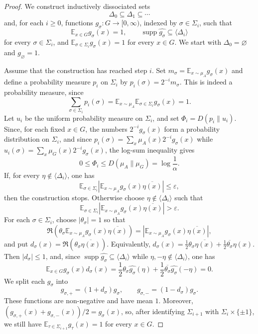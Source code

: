\documentclass[10pt,a4paper]{amsart}
\begin{document}
\begin{proof}
We construct inductively dissociated sets
$$
\Delta_0\subseteq \Delta_1\subseteq \cdots
$$
and, for each $i\ge 0$, functions $g_\sigma:G\to[0,\infty)$, indexed by
$\sigma\in\Sigma_i$, such that
$$
\mathbb E_{x\in G}g_\sigma(x)=1,
\qquad
\operatorname{supp}\widehat{g_\sigma}\subseteq \langle\Delta_i\rangle
$$
for every $\sigma\in\Sigma_i$, and
$\mathbb E_{\sigma\in\Sigma_i}g_\sigma(x)=1$ for every $x\in G$. We start with
$\Delta_0=\varnothing$ and $g_\varnothing=1$.

Assume that the construction has reached step $i$. Set
$m_\sigma=\mathbb E_{x\sim\mu_A}g_\sigma(x)$ and define a probability measure
$p_i$ on $\Sigma_i$ by $p_i(\sigma)=2^{-i}m_\sigma$. This is indeed a
probability measure, since
$$
\sum_{\sigma\in\Sigma_i}p_i(\sigma)
=
\mathbb E_{x\sim\mu_A}\mathbb E_{\sigma\in\Sigma_i}g_\sigma(x)
=
1.
$$
Let $u_i$ be the uniform probability measure on $\Sigma_i$, and set
$\Phi_i=D(p_i\|u_i)$. Since, for each fixed $x\in G$, the numbers
$2^{-i}g_\sigma(x)$ form a probability distribution on $\Sigma_i$, and since
$p_i(\sigma)=\sum_x\mu_A(x)2^{-i}g_\sigma(x)$ while
$u_i(\sigma)=\sum_x\mu_G(x)2^{-i}g_\sigma(x)$, the log-sum inequality gives
$$
0\le \Phi_i\le D(\mu_A\|\mu_G)=\log\frac1\alpha.
$$
If, for every $\eta\notin\langle\Delta_i\rangle$, one has
$$
\mathbb E_{\sigma\in\Sigma_i}
\left|
\mathbb E_{x\sim\mu_A}g_\sigma(x)\overline{\eta(x)}
\right|
\le \varepsilon,
$$
then the construction stops. Otherwise choose $\eta\notin\langle\Delta_i\rangle$
such that
$$
\mathbb E_{\sigma\in\Sigma_i}
\left|
\mathbb E_{x\sim\mu_A}g_\sigma(x)\overline{\eta(x)}
\right|
>
\varepsilon.
$$
For each $\sigma\in\Sigma_i$, choose $|\theta_\sigma|=1$ so that
$$
\Re\left(
\theta_\sigma
\mathbb E_{x\sim\mu_A}g_\sigma(x)\overline{\eta(x)}
\right)
=
\left|
\mathbb E_{x\sim\mu_A}g_\sigma(x)\overline{\eta(x)}
\right|,
$$
and put
$
d_\sigma(x)=\Re(\theta_\sigma\overline{\eta(x)}).
$
Equivalently,
$
d_\sigma(x)
=
\frac12\theta_\sigma\overline{\eta(x)}
+
\frac12\overline{\theta_\sigma}\eta(x).
$
Then $|d_\sigma|\le 1$, and, since
$\operatorname{supp}\widehat{g_\sigma}\subseteq\langle\Delta_i\rangle$ while
$\eta,-\eta\notin\langle\Delta_i\rangle$, one has
$$
\mathbb E_{x\in G}g_\sigma(x)d_\sigma(x)
=
\frac12\theta_\sigma\widehat{g_\sigma}(\eta)
+
\frac12\overline{\theta_\sigma}\widehat{g_\sigma}(-\eta)
=
0.
$$
We split each $g_\sigma$ into
$$
g_{\sigma,+}=(1+d_\sigma)g_\sigma,
\qquad
g_{\sigma,-}=(1-d_\sigma)g_\sigma.
$$
These functions are non-negative and have mean $1$. Moreover,
$(g_{\sigma,+}(x)+g_{\sigma,-}(x))/2=g_\sigma(x)$, so, after identifying
$\Sigma_{i+1}$ with $\Sigma_i\times\{\pm1\}$, we still have
$\mathbb E_{\tau\in\Sigma_{i+1}}g_\tau(x)=1$ for every $x\in G$.


\end{proof}
\end{document}
